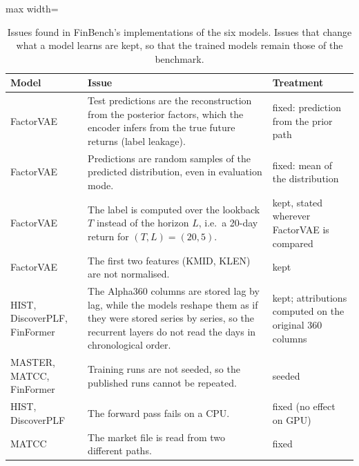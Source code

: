 \begin{table}[htbp]
    \centering
    \footnotesize
    \begin{adjustbox}{max width=\textwidth}
    \begin{tabular}{@{}p{2.1cm}p{7.6cm}p{3.2cm}@{}}
        \toprule
        \textbf{Model} & \textbf{Issue} & \textbf{Treatment} \\
        \midrule
        FactorVAE & Test predictions are the reconstruction from the posterior factors, which the encoder infers from the true future returns (label leakage). & fixed: prediction from the prior path \\
        FactorVAE & Predictions are random samples of the predicted distribution, even in evaluation mode. & fixed: mean of the distribution \\
        FactorVAE & The label is computed over the lookback $T$ instead of the horizon $L$, i.e.\ a 20-day return for $(T, L) = (20, 5)$. & kept, stated wherever FactorVAE is compared \\
        FactorVAE & The first two features (KMID, KLEN) are not normalised. & kept \\
        HIST, DiscoverPLF, FinFormer & The Alpha360 columns are stored lag by lag, while the models reshape them as if they were stored series by series, so the recurrent layers do not read the days in chronological order. & kept; attributions computed on the original 360 columns \\
        MASTER, MATCC, FinFormer & Training runs are not seeded, so the published runs cannot be repeated. & seeded \\
        HIST, DiscoverPLF & The forward pass fails on a CPU. & fixed (no effect on GPU) \\
        MATCC & The market file is read from two different paths. & fixed \\
        \bottomrule
    \end{tabular}
    \end{adjustbox}
    \caption{Issues found in FinBench's implementations of the six models. Issues that change what a model learns are kept, so that the trained models remain those of the benchmark.}
    \label{tab:fw_issues}
\end{table}

